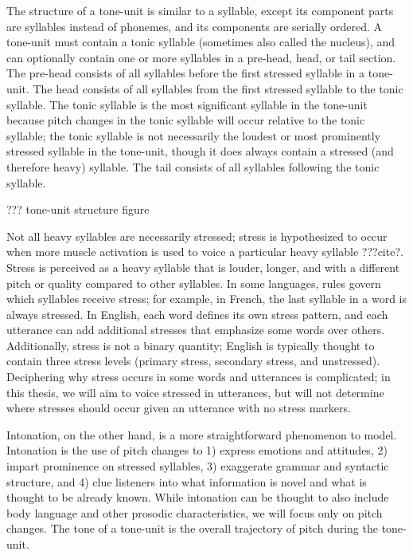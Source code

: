 The structure of a tone-unit is similar
to a syllable, except its component parts
are syllables instead of phonemes,
and its components are serially ordered.
A tone-unit must contain a tonic syllable
(sometimes also called the nucleus),
and can optionally contain one or more syllables
in a pre-head, head, or tail section.
The pre-head consists of all syllables
before the first stressed syllable
in a tone-unit.
The head consists of all syllables from
the first stressed syllable
to the tonic syllable.
The tonic syllable is the most significant
syllable in the tone-unit because
pitch changes in the tonic syllable
will occur relative to the tonic syllable;
the tonic syllable is not necessarily
the loudest or most prominently stressed
syllable in the tone-unit,
though it does always contain
a stressed (and therefore heavy) syllable.
The tail consists of all syllables
following the tonic syllable.

??? tone-unit structure figure

Not all heavy syllables are necessarily stressed;
stress is hypothesized to occur when
more muscle activation is used
to voice a particular heavy syllable
???cite?.
Stress is perceived as a heavy syllable
that is louder, longer, and with
a different pitch or quality compared
to other syllables.
In some languages, rules govern
which syllables receive stress;
for example, in French,
the last syllable in a word is
always stressed.
In English, each word defines
its own stress pattern,
and each utterance can add
additional stresses
that emphasize some words over others.
Additionally, stress is not a binary quantity;
English is typically thought to contain
three stress levels
(primary stress, secondary stress, and unstressed).
Deciphering why stress occurs
in some words and utterances
is complicated;
in this thesis,
we will aim to voice stressed
in utterances, but will not
determine where stresses should occur
given an utterance with no stress markers.

Intonation, on the other hand,
is a more straightforward phenomenon to model.
Intonation is the use of pitch changes
to 1) express emotions and attitudes,
2) impart prominence on stressed syllables,
3) exaggerate grammar and syntactic structure,
and 4) clue listeners into what information
is novel and what is thought to be already known.
While intonation can be thought to also include
body language and other prosodic characteristics,
we will focus only on pitch changes.
The tone of a tone-unit
is the overall trajectory of pitch
during the tone-unit.

